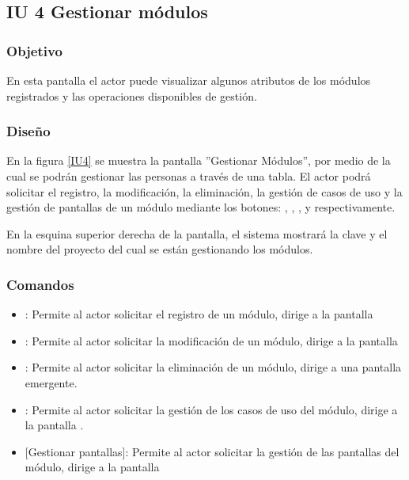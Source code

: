 \subsection{IU 4 Gestionar módulos}

\subsubsection{Objetivo}
	En esta pantalla el actor puede visualizar algunos atributos de los módulos registrados y las operaciones disponibles de gestión.
\subsubsection{Diseño}
	En la figura \ref{IU4} se muestra la pantalla ''Gestionar Módulos'', por medio de la cual se podrán gestionar las personas a través de una tabla. El actor podrá solicitar el registro, la modificación, la eliminación, la gestión de casos de uso y la gestión de pantallas de un módulo mediante los botones: , \editar, \eliminar, {\UCsist } y  respectivamente.
	
	En la esquina superior derecha de la pantalla, el sistema mostrará la clave y el nombre del proyecto del cual se están gestionando los módulos.

\label{IU4}
\subsubsection{Comandos}
\begin{itemize}
	\item {}: Permite al actor solicitar el registro de un módulo, dirige a la pantalla 
	\item \editar [Modificar]: Permite al actor solicitar la modificación de un módulo, dirige a la pantalla 
	\item \eliminar [Eliminar]: Permite al actor solicitar la eliminación de un módulo, dirige a una pantalla emergente.
	\item {}: Permite al actor solicitar la gestión de los casos de uso del módulo, dirige a la pantalla .
	\item {} [Gestionar pantallas]: Permite al actor solicitar la gestión de las pantallas del módulo, dirige a la pantalla 
\end{itemize}

